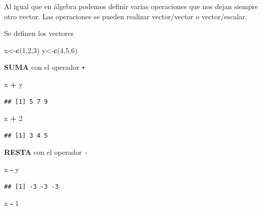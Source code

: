 \documentclass[
]{book}
\newenvironment{Shaded}{\begin{snugshade}}{\end{snugshade}}
\newcommand{\DecValTok}[1]{\textcolor[rgb]{0.00,0.00,0.81}{#1}}
\newcommand{\FunctionTok}[1]{\textcolor[rgb]{0.13,0.29,0.53}{\textbf{#1}}}
\newcommand{\NormalTok}[1]{#1}
\newcommand{\OtherTok}[1]{\textcolor[rgb]{0.56,0.35,0.01}{#1}}
\newcommand{\SpecialCharTok}[1]{\textcolor[rgb]{0.81,0.36,0.00}{\textbf{#1}}}
\begin{document}
Al igual que en álgebra podemos definir varias operaciones que nos dejan siempre otro vector. Las operaciones se pueden realizar vector/vector o vector/escalar.

Se definen los vectores

\begin{Shaded}
\begin{Highlighting}[]
\NormalTok{x}\OtherTok{\textless{}{-}}\FunctionTok{c}\NormalTok{(}\DecValTok{1}\NormalTok{,}\DecValTok{2}\NormalTok{,}\DecValTok{3}\NormalTok{)}
\NormalTok{y}\OtherTok{\textless{}{-}}\FunctionTok{c}\NormalTok{(}\DecValTok{4}\NormalTok{,}\DecValTok{5}\NormalTok{,}\DecValTok{6}\NormalTok{)}
\end{Highlighting}
\end{Shaded}

\textbf{SUMA} con el operador \texttt{+}

\begin{Shaded}
\begin{Highlighting}[]
\NormalTok{x }\SpecialCharTok{+}\NormalTok{ y }
\end{Highlighting}
\end{Shaded}

\begin{verbatim}
## [1] 5 7 9
\end{verbatim}

\begin{Shaded}
\begin{Highlighting}[]
\NormalTok{x }\SpecialCharTok{+} \DecValTok{2}
\end{Highlighting}
\end{Shaded}

\begin{verbatim}
## [1] 3 4 5
\end{verbatim}

\textbf{RESTA} con el operador \texttt{-}

\begin{Shaded}
\begin{Highlighting}[]
\NormalTok{x }\SpecialCharTok{{-}}\NormalTok{ y}
\end{Highlighting}
\end{Shaded}

\begin{verbatim}
## [1] -3 -3 -3
\end{verbatim}

\begin{Shaded}
\begin{Highlighting}[]
\NormalTok{x }\SpecialCharTok{{-}} \DecValTok{1}
\end{Highlighting}
\end{Shaded}
\end{document}
